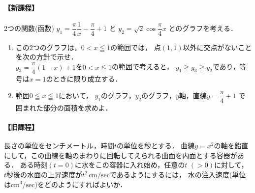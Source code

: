 \documentclass[../../main.tex]{subfiles}
\begin{document}
\paragraph{【新課程】}
2つの関数(函数) $y_1=\dfrac{\pi}{4}\dfrac{1}{x}-\dfrac{\pi}{4}+1$ と
$y_2=\sqrt{2}\cos\dfrac{\pi}{4}x$ とのグラフを考える．
\begin{enumerate}
  \item この2つのグラフは，$0<x \leqq 1$の範囲では，
    点$(1,1)$以外に交点がないことを次の方針で示せ．\\
    $y_3=\dfrac{\pi}{4}(1-x)+1$を$0<x \leqq 1$の範囲で考えると，
    $y_1 \geqq y_3 \geqq y_2$であり，等号は$x=1$のときに限り成立する．
  \item 範囲$0 \leqq x \leqq 1$において，
    $y_1$のグラフ，$y_2$のグラフ，$y$軸，直線$y=\dfrac{\pi}{4}+1$
    で囲まれた部分の面積を求めよ．
\end{enumerate}

\paragraph{【旧課程】}
長さの単位をセンチメートル，時間$t$の単位を秒とする．
曲線$y=x^2$の軸を鉛直にして，この曲線を軸のまわりに回転してえられる曲面を内面とする容器がある．
ある時刻$(t=0)$に水をこの容器に入れ始め，任意の$t$ $(>0)$に対して，
$t$秒後の水面の上昇速度が$t^2\,\text{cm/sec}$であるようにするには，
水の注入速度(単位は$\text{cm}^3/\text{sec}$)をどのようにすればよいか．
\end{document}
